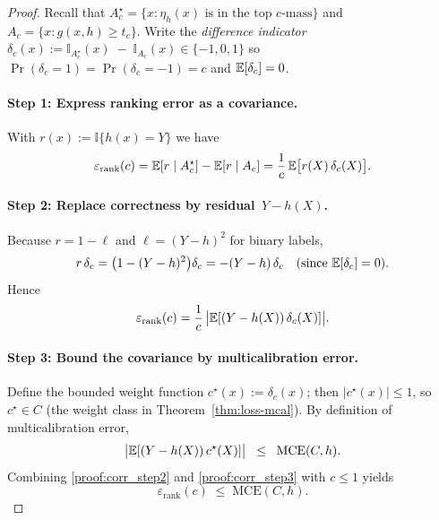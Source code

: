 \begin{proof}
Recall that
\(
A_c^{\star}
=\{x:\eta_h(x)\text{ is in the top }c\text{-mass}\}
\)
and
\(A_c
=\{x:g(x,h)\ge t_c\}\).
Write the \emph{difference indicator}
\(
\delta_c(x)
:=\mathbb{I}_{A_c^{\star}}(x)\;-\;\mathbb{I}_{A_c}(x)\in\{-1,0,1\}\) so 
\(\Pr(\delta_c=1)=\Pr(\delta_c=-1)=c\) and
\(\mathbb{E}[\delta_c]=0\).

\paragraph{Step 1:  Express ranking error as a covariance.}
With \(r(x):=\mathbb{I}\{h(x)=Y\}\) we have
\begin{equation}
\varepsilon_{\text{rank}}(c)
=\mathbb{E}[r\mid A_c^{\star}]-\mathbb{E}[r\mid A_c]
=\frac{1}{c}\,\mathbb{E}\bigl[r(X)\,\delta_c(X)\bigr].
\end{equation}

\paragraph{Step 2:  Replace correctness by residual \(\,Y-h(X)\).}
Because \(r=1-\ell\) and \(\ell=(Y-h)^2\) for binary labels,
\begin{equation}
r\,\delta_c
=\bigl(1-(Y-h)^2\bigr)\delta_c
=-(Y-h)\,\delta_c
\quad\text{(since }\mathbb{E}[\delta_c]=0\text{)}.
\end{equation}
Hence
\begin{equation}
\label{proof:corr_step2}
\varepsilon_{\text{rank}}(c)
=\frac{1}{c}\,
\bigl|\mathbb{E}[(Y-h(X))\,\delta_c(X)]\bigr|.
\end{equation}

\paragraph{Step 3:  Bound the covariance by multicalibration error.}
Define the bounded weight function \(c^{\star}(x):=\delta_c(x)\); then
\(|c^{\star}(x)|\le 1\), so \(c^{\star}\in C\) (the weight class in
Theorem~\ref{thm:loss-mcal}).  By definition of multicalibration error,
\begin{equation}
\label{proof:corr_step3}
\bigl|\mathbb{E}[(Y-h(X))\,c^{\star}(X)]\bigr|
\;\;\le\;\;
\mathrm{MCE}(C,h).
\end{equation}
Combining \eqref{proof:corr_step2} and \eqref{proof:corr_step3} with \(c\le 1\) yields
\begin{equation}
\varepsilon_{\text{rank}}(c)
\;\le\;
\mathrm{MCE}(C,h).
\end{equation}


\end{proof}
